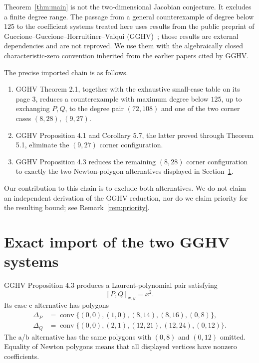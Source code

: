 \documentclass[11pt]{article}
\theoremstyle{definition}
\theoremstyle{remark}
\newcommand{\conv}{\operatorname{conv}}
\begin{document}
Theorem~\ref{thm:main} is not the two-dimensional Jacobian conjecture.
It excludes a finite degree range.  The passage from a general
counterexample of degree below \(125\) to the coefficient systems treated
here uses results from the public preprint of
Guccione--Guccione--Horruitiner--Valqui (GGHV)~\cite{GGHV2022}; those
results are external dependencies and are not reproved.
We use them with the algebraically closed characteristic-zero convention
inherited from the earlier papers cited by GGHV.

The precise imported chain is as follows.

\begin{enumerate}
\item GGHV Theorem 2.1, together with the exhaustive small-case table on
  its page 3, reduces a counterexample with maximum degree below \(125\),
  up to exchanging \(P,Q\), to the degree pair \((72,108)\) and one of
  the two corner cases \((8,28)\), \((9,27)\).
\item GGHV Proposition 4.1 and Corollary 5.7, the latter proved through
  Theorem 5.1, eliminate the \((9,27)\) corner configuration.
\item GGHV Proposition 4.3 reduces the remaining \((8,28)\) corner
  configuration to exactly the two Newton-polygon alternatives displayed
  in Section~\ref{sec:import}.
\end{enumerate}

Our contribution to this chain is to exclude both alternatives.  We do
not claim an independent derivation of the GGHV reduction, nor do we
claim priority for the resulting bound; see Remark~\ref{rem:priority}.

\section{Exact import of the two GGHV systems}\label{sec:import}

GGHV Proposition 4.3 produces a Laurent-polynomial pair satisfying
\[
 [P,Q]_{x,y}=x^2. \tag{2.1}
\]
Its case-c alternative has polygons
\[
\begin{aligned}
\Delta_P&=\conv\{(0,0),(1,0),(8,14),(8,16),(0,8)\},\\
\Delta_Q&=\conv\{(0,0),(2,1),(12,21),(12,24),(0,12)\}.
\end{aligned} \tag{2.2}
\]
The a/b alternative has the same polygons with \((0,8)\) and \((0,12)\)
omitted.  Equality of Newton polygons means that all displayed vertices
have nonzero coefficients.
\end{document}
